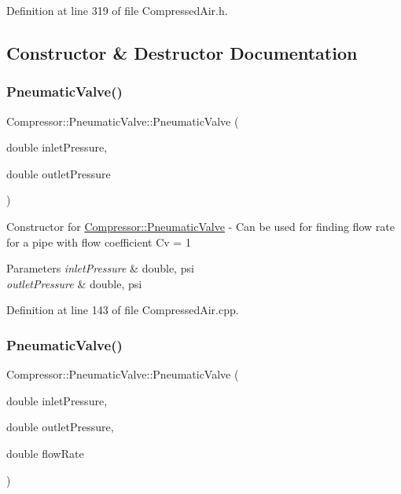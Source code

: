 Definition at line 319 of file Compressed\+Air.\+h.



\subsection{Constructor \& Destructor Documentation}
\mbox{\label{class_compressor_1_1_pneumatic_valve_a8c883ff13640780f40d026984e9116f7}} 
\subsubsection{\texorpdfstring{Pneumatic\+Valve()}{PneumaticValve()}\hspace{0.1cm}{\footnotesize\ttfamily [1/6]}}
{\footnotesize\ttfamily Compressor\+::\+Pneumatic\+Valve\+::\+Pneumatic\+Valve (\begin{DoxyParamCaption}\item[{double}]{inlet\+Pressure,  }\item[{double}]{outlet\+Pressure }\end{DoxyParamCaption})}

Constructor for \hyperlink{class_compressor_1_1_pneumatic_valve}{Compressor\+::\+Pneumatic\+Valve} -\/ Can be used for finding flow rate for a pipe with flow coefficient Cv = 1 
\begin{DoxyParams}{Parameters}
{\em inlet\+Pressure} & double, psi \\
\hline
{\em outlet\+Pressure} & double, psi \\
\hline
\end{DoxyParams}


Definition at line 143 of file Compressed\+Air.\+cpp.

\mbox{\label{class_compressor_1_1_pneumatic_valve_adc3d621e933c23b13d1f20378704336b}} 
\subsubsection{\texorpdfstring{Pneumatic\+Valve()}{PneumaticValve()}\hspace{0.1cm}{\footnotesize\ttfamily [2/6]}}
{\footnotesize\ttfamily Compressor\+::\+Pneumatic\+Valve\+::\+Pneumatic\+Valve (\begin{DoxyParamCaption}\item[{double}]{inlet\+Pressure,  }\item[{double}]{outlet\+Pressure,  }\item[{double}]{flow\+Rate }\end{DoxyParamCaption})}

